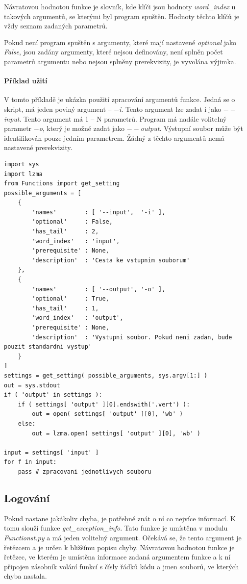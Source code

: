 Návratovou hodnotou funkce je slovník, kde klíči jsou hodnoty \textit{word\_index} u takových argumentů, se kterými
byl program spuštěn. Hodnoty těchto klíčů je vždy seznam zadaných parametrů.

Pokud není program spuštěn s argumenty,
které mají nastavené \textit{optional} jako \textit{False}, jsou zadány argumenty, které nejsou definovány, není splněn
počet parametrů argumentu nebo nejsou splněny prerekvizity, je vyvolána výjimka.

\paragraph{Příklad užití}
V tomto příkladě je ukázka použití zpracování argumentů funkce. Jedná se o skript, má jeden poviný
argument -- \textit{$-$i}. Tento argument lze zadat i jako \textit{$--$input}. Tento argument má
1 -- N parametrů. Program má nadále volitelný parametr \textit{$-$o}, který je možné zadat jako
\textit{$--$output}. Výstupní soubor může být identifikován pouze jedním parametrem.
Žádný z těchto argumentů nemá nastavené prerekvizity.
\begin{lstlisting}
import sys
import lzma
from Functions import get_setting
possible_arguments = [
    {
        'names'        : [ '--input',  '-i' ],
        'optional'     : False,
        'has_tail'     : 2,
        'word_index'   : 'input',
        'prerequisite' : None,
        'description'  : 'Cesta ke vstupnim souborum'
    },
    {
        'names'        : [ '--output', '-o' ],
        'optional'     : True,
        'has_tail'     : 1,
        'word_index'   : 'output',
        'prerequisite' : None,
        'description'  : 'Vystupni soubor. Pokud neni zadan, bude pouzit standardni vystup'
    }
]
settings = get_setting( possible_arguments, sys.argv[1:] )
out = sys.stdout
if ( 'output' in settings ):
    if ( settings[ 'output' ][0].endswith('.vert') ):
        out = open( settings[ 'output' ][0], 'wb' )
    else:
        out = lzma.open( settings[ 'output' ][0], 'wb' )

input = settings[ 'input' ]
for f in input:
    pass # zpracovani jednotlivych souboru
\end{lstlisting}

\subsection{Logování}
Pokud nastane jakákoliv chyba, je potřebné znát o ní co nejvíce informací. K tomu
slouží funkce \textit{get\_exception\_info}. Tato funkce je umístěna v modulu \textit{Functionst.py}
a má jeden volitelný argument. Očekává se, že tento argument je řetězcem a je určen k bližšímu
popisu chyby. Návratovou hodnotou funkce je řetězec, ve kterém je umístěna informace zadaná
argumentem funkce a k ní připojen zásobník volání funkcí s čísly řádků kódu a jmen souborů,
ve kterých chyba nastala.

